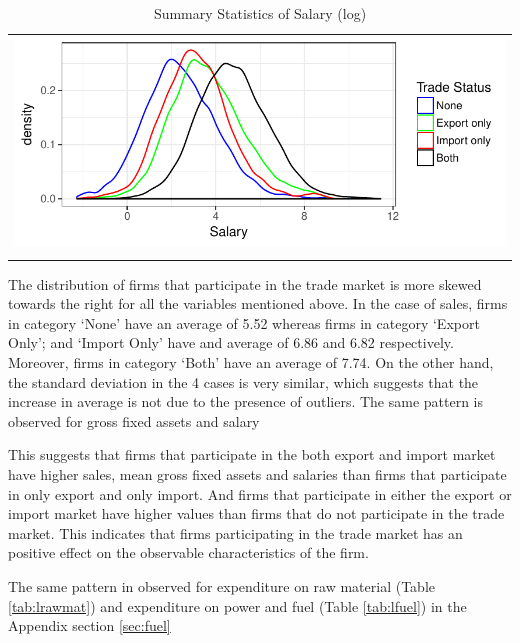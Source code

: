 \documentclass[12pt]{article}
\begin{document}
\begin{center}
\begin{table}[H]
\caption{Summary Statistics of Salary (log)}
\label{tab:lsalary}
\begin{tabular}{c}
 \includegraphics{./PICS/denslsalary.pdf}   \\ 
   \\  
\end{tabular}
\end{table}
\end{center}

The distribution of firms that participate in the trade market is more skewed towards the right for all the
variables mentioned above. In the case of sales, firms in category
`None' have an average of 5.52 whereas firms in category `Export Only';
and `Import Only' have and average  of 6.86 and
6.82 respectively. Moreover, firms in category `Both' have an average
of  7.74.  On the other hand, the standard deviation in the 4 
cases is very similar, which suggests that the increase in average is
not due to the presence of outliers. The same pattern is observed for
gross fixed assets and salary  

This suggests that firms that participate in the both export and import market have
higher sales, mean gross fixed assets and 
salaries  than firms that participate in
only export and only import.  And firms that participate in either the
export or import market have higher values  than firms that do not
participate in the trade market. This indicates that firms participating
in the trade market has an positive effect on the observable
characteristics of the firm.

The same pattern in observed for expenditure on raw material (Table \ref{tab:lrawmat}) and
expenditure on power and fuel (Table \ref{tab:lfuel}) in the Appendix
section \ref{sec:fuel}
\end{document}
